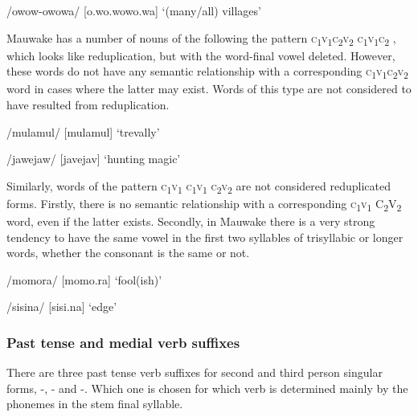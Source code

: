 /owow-owowa/  [o.{{\textprimstress}}wo.wo{{\textprimstress}}{{\textprimstress}}wo.wa]  `(many/all) villages'

Mauwake has a number of nouns of the following the pattern \textsc{c}\textsubscript{1}\textsc{v}\textsubscript{1}\textsc{c}\textsubscript{2}\textsc{v}\textsubscript{2} \textsc{c}\textsubscript{1}\textsc{v}\textsubscript{1}\textsc{c}\textsubscript{2} , which looks like reduplication, but with the word-final vowel deleted.  However, these words do not have any semantic relationship with a corresponding \textsc{c}\textsubscript{1}\textsc{v}\textsubscript{1}\textsc{c}\textsubscript{2}\textsc{v}\textsubscript{2} word in cases where the latter may exist.  Words of this type are not considered to have resulted from reduplication.

/mulamul/  [mu{{\textprimstress}lamul}]  `trevally'

/jawejaw/  [ja{{\textprimstress}vejav}]  `hunting magic'

Similarly, words of the pattern \textsc{c}\textsubscript{1}\textsc{v}\textsubscript{1} \textsc{c}\textsubscript{1}\textsc{v}\textsubscript{1} \textsc{c}\textsubscript{2}\textsc{v}\textsubscript{2} are not considered reduplicated forms.  Firstly, there is no semantic relationship with a corresponding \textsc{c}\textsubscript{1}\textsc{v}\textsubscript{1} C\textsubscript{2}V\textsubscript{2} word, even if the latter exists. Secondly, in Mauwake there is a very strong tendency to have the same vowel in the first two syllables of trisyllabic or longer words, whether the consonant is the same or not. 

/momora/  [mo{{\textprimstress}mo.ra}]  `fool(ish)'

/sisina/  [si{{\textprimstress}si.na}]  `edge'

\subsubsection{Past tense and medial verb suffixes}\footnotemark{}

There are three past tense verb suffixes for second and third person singular forms, -, - and -.  Which one is chosen for which verb is determined mainly by the phonemes in the stem final syllable. 

